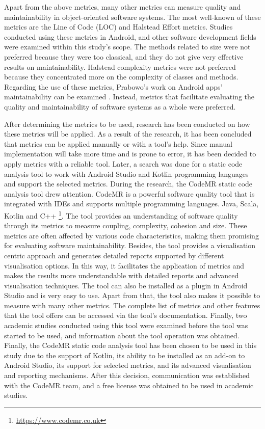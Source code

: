 Apart from the above metrics, many other metrics can measure quality and maintainability in object-oriented software systems. The most well-known of these metrics are the Line of Code (LOC) and Halstead Effort metrics. Studies conducted using these metrics in Android, and other software development fields were examined within this study's scope. The methods related to size were not preferred because they were too classical, and they do not give very effective results on maintainability. Halstead complexity metrics were not preferred because they concentrated more on the complexity of classes and methods. Regarding the use of these metrics, Prabowo's work on Android apps' maintainability can be examined \cite{19}. Instead, metrics that facilitate evaluating the quality and maintainability of software systems as a whole were preferred.

After determining the metrics to be used, research has been conducted on how these metrics will be applied. As a result of the research, it has been concluded that metrics can be applied manually or with a tool's help. Since manual implementation will take more time and is prone to error, it has been decided to apply metrics with a reliable tool. Later, a search was done for a static code analysis tool to work with Android Studio and Kotlin programming languages and support the selected metrics. During the research, the CodeMR static code analysis tool drew attention. CodeMR is a powerful software quality tool that is integrated with IDEs and supports multiple programming languages. Java, Scala, Kotlin and C++ \footnote{\url{https://www.codemr.co.uk}}. The tool provides an understanding of software quality through its metrics to measure coupling, complexity, cohesion and size. These metrics are often affected by various code characteristics, making them promising for evaluating software maintainability.  Besides, the tool provides a visualisation centric approach and generates detailed reports supported by different visualisation options. In this way, it facilitates the application of metrics and makes the results more understandable with detailed reports and advanced visualisation techniques. The tool can also be installed as a plugin in Android Studio and is very easy to use. Apart from that, the tool also makes it possible to measure with many other metrics. The complete list of metrics and other features that the tool offers can be accessed via the tool's documentation. Finally, two academic studies conducted using this tool were examined before the tool was started to be used, and information about the tool operation was obtained\cite{38}\cite{39}. Finally, the CodeMR static code analysis tool has been chosen to be used in this study due to the support of Kotlin, its ability to be installed as an add-on to Android Studio, its support for selected metrics, and its advanced visualisation and reporting mechanisms. After this decision, communication was established with the CodeMR team, and a free license was obtained to be used in academic studies. 

